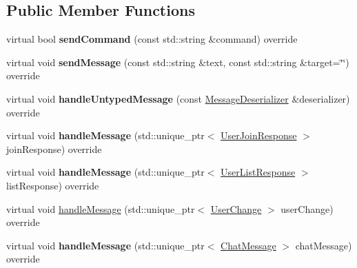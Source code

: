 \subsection*{Public Member Functions}
\begin{DoxyCompactItemize}
\item 
\hypertarget{classSimpleChat_1_1ChatClient_a3ca3b550ca39f0e467568d47c02528e0}{virtual bool {\bfseries send\-Command} (const std\-::string \&command) override}\label{classSimpleChat_1_1ChatClient_a3ca3b550ca39f0e467568d47c02528e0}

\item 
\hypertarget{classSimpleChat_1_1ChatClient_a0b36d2b71249b8aa1b6a57e6a0e2c6e8}{virtual void {\bfseries send\-Message} (const std\-::string \&text, const std\-::string \&target=\char`\"{}\char`\"{}) override}\label{classSimpleChat_1_1ChatClient_a0b36d2b71249b8aa1b6a57e6a0e2c6e8}

\item 
\hypertarget{classSimpleChat_1_1ChatClient_a3cda3fd789bd6862bdfa0409b09f43aa}{virtual void {\bfseries handle\-Untyped\-Message} (const \hyperlink{classSimpleChat_1_1MessageDeserializer}{Message\-Deserializer} \&deserializer) override}\label{classSimpleChat_1_1ChatClient_a3cda3fd789bd6862bdfa0409b09f43aa}

\item 
\hypertarget{classSimpleChat_1_1ChatClient_aef22a40abcc5c04daa080146e9f8e493}{virtual void {\bfseries handle\-Message} (std\-::unique\-\_\-ptr$<$ \hyperlink{classSimpleChat_1_1UserJoinResponse}{User\-Join\-Response} $>$ join\-Response) override}\label{classSimpleChat_1_1ChatClient_aef22a40abcc5c04daa080146e9f8e493}

\item 
\hypertarget{classSimpleChat_1_1ChatClient_af5dddaded163059d6f77531c368d52d7}{virtual void {\bfseries handle\-Message} (std\-::unique\-\_\-ptr$<$ \hyperlink{classSimpleChat_1_1UserListResponse}{User\-List\-Response} $>$ list\-Response) override}\label{classSimpleChat_1_1ChatClient_af5dddaded163059d6f77531c368d52d7}

\item 
virtual void \hyperlink{classSimpleChat_1_1ChatClient_a432edc64a95f480235df3d1d7f55fbce}{handle\-Message} (std\-::unique\-\_\-ptr$<$ \hyperlink{classSimpleChat_1_1UserChange}{User\-Change} $>$ user\-Change) override
\item 
\hypertarget{classSimpleChat_1_1ChatClient_ae9c20505289ce814b27299cfb3a7db77}{virtual void {\bfseries handle\-Message} (std\-::unique\-\_\-ptr$<$ \hyperlink{classSimpleChat_1_1ChatMessage}{Chat\-Message} $>$ chat\-Message) override}\label{classSimpleChat_1_1ChatClient_ae9c20505289ce814b27299cfb3a7db77}


\end{DoxyCompactItemize}

